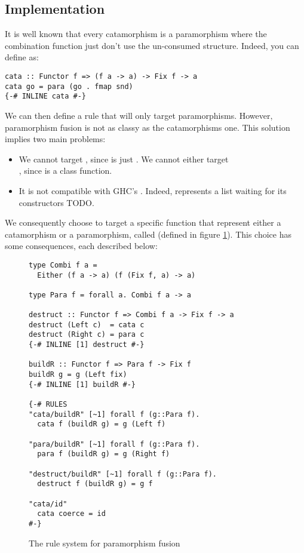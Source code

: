 \subsection{Implementation}
\label{sec:para-impl}

It is well known that every catamorphism is a paramorphism where the combination function just don't use the un-consumed structure. Indeed, you can define  as:
\begin{verbatim}
cata :: Functor f => (f a -> a) -> Fix f -> a
cata go = para (go . fmap snd)
{-# INLINE cata #-}
\end{verbatim}

\noindent We can then define a rule that will only target paramorphisms. However, paramorphism fusion is not as classy as the catamorphisms one. This solution implies two main problems:
\begin{itemize}
\item We cannot target , since  is just . We cannot either target\\ , since  is a class function.

\item It is not compatible with GHC's . Indeed,  represents a list waiting for its constructors TODO.
\end{itemize}

We consequently choose to target a specific function that represent either a catamorphism or a paramorphism, called  (defined in figure \ref{fig:para}). This choice has some consequences, each described below:

\begin{figure}
\begin{verbatim}
type Combi f a =
  Either (f a -> a) (f (Fix f, a) -> a)
  
type Para f = forall a. Combi f a -> a 

destruct :: Functor f => Combi f a -> Fix f -> a
destruct (Left c)  = cata c
destruct (Right c) = para c
{-# INLINE [1] destruct #-}

buildR :: Functor f => Para f -> Fix f
buildR g = g (Left fix)
{-# INLINE [1] buildR #-}

{-# RULES
"cata/buildR" [~1] forall f (g::Para f).
  cata f (buildR g) = g (Left f)

"para/buildR" [~1] forall f (g::Para f).
  para f (buildR g) = g (Right f)

"destruct/buildR" [~1] forall f (g::Para f).
  destruct f (buildR g) = g f

"cata/id"
  cata coerce = id
#-}

\end{verbatim}
\caption{The rule system for paramorphism fusion}
\label{fig:para}
\end{figure}

